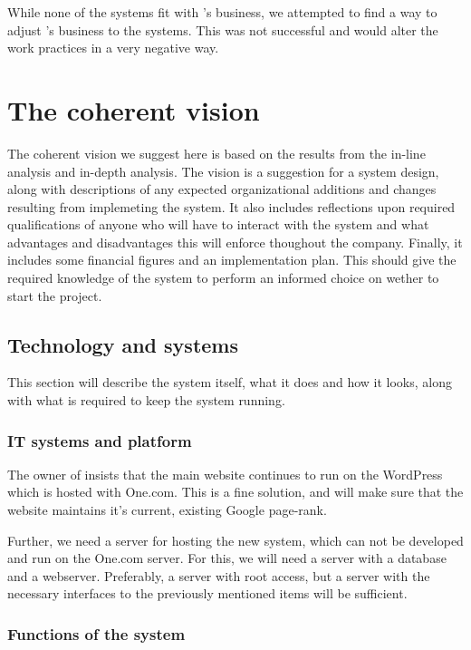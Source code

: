 While none of the systems fit with \gomonkey{}'s business, we attempted
to find a way to adjust \gomonkey{}'s business to the systems. This was not 
successful and would alter the work practices in a very negative way.


\section{The coherent vision}
The coherent vision we suggest here is based on the results from the in-line 
analysis and in-depth analysis. The vision is a suggestion for a system design, 
along with descriptions of any expected organizational additions and changes 
resulting from implemeting the system. It also includes reflections upon 
required qualifications of anyone who will have to interact with the system
and what advantages and disadvantages this will enforce thoughout the company.
Finally, it includes some financial figures and an implementation plan. This 
should give the required knowledge of the system to perform an informed choice
on wether to start the project.

\subsection{Technology and systems}
This section will describe the system itself, what it does and how it looks,
along with what is required to keep the system running.

\subsubsection{IT systems and platform}
The owner of \gomonkey insists that the main website continues to run on the 
WordPress which is hosted with One.com. This is a fine solution, and will make
sure that the website maintains it's current, existing Google page-rank.

Further, we need a server for hosting the new system, which can not be developed
and run on the One.com server. For this, we will need a server with a database
and a webserver. Preferably, a server with root access, but a server with the 
necessary interfaces to the previously mentioned items will be sufficient.

\subsubsection{Functions of the system}

